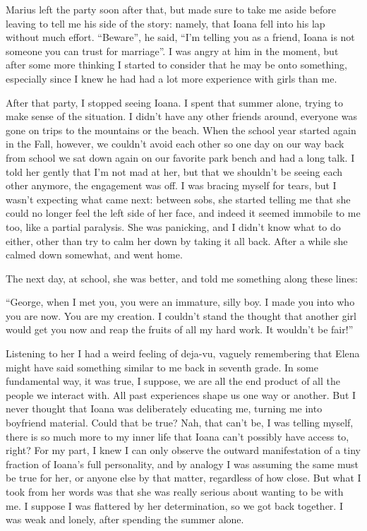 \documentclass[12pt]{book}
\begin{document}
Marius left the party soon after that, but made sure to take me aside
before leaving to tell me his side of the story: namely, that Ioana fell
into his lap without much effort. ``Beware'', he said, ``I'm telling you
as a friend, Ioana is not someone you can trust for marriage''. I was
angry at him in the moment, but after some more thinking I started to
consider that he may be onto something, especially since I knew he had
had a lot more experience with girls than me.

After that party, I stopped seeing Ioana. I spent that summer alone,
trying to make sense of the situation. I didn't have any other friends
around, everyone was gone on trips to the mountains or the beach. When
the school year started again in the Fall, however, we couldn't avoid
each other so one day on our way back from school we sat down again on
our favorite park bench and had a long talk. I told her gently that I'm
not mad at her, but that we shouldn't be seeing each other anymore, the
engagement was off. I was bracing myself for tears, but I wasn't
expecting what came next: between sobs, she started telling me that she
could no longer feel the left side of her face, and indeed it seemed
immobile to me too, like a partial paralysis. She was panicking, and I
didn't know what to do either, other than try to calm her down by taking
it all back. After a while she calmed down somewhat, and went home.

The next day, at school, she was better, and told me something along
these lines:

``George, when I met you, you were an immature, silly boy. I made you
into who you are now. You are my creation. I couldn't stand the thought
that another girl would get you now and reap the fruits of all my hard
work. It wouldn't be fair!''

Listening to her I had a weird feeling of deja-vu, vaguely remembering
that Elena might have said something similar to me back in seventh
grade. In some fundamental way, it was true, I suppose, we are all the
end product of all the people we interact with. All past experiences
shape us one way or another. But I never thought that Ioana was
deliberately educating me, turning me into boyfriend material. Could
that be true? Nah, that can't be, I was telling myself, there is so much
more to my inner life that Ioana can't possibly have access to, right?
For my part, I knew I can only observe the outward manifestation of a
tiny fraction of Ioana's full personality, and by analogy I was assuming
the same must be true for her, or anyone else by that matter, regardless
of how close. But what I took from her words was that she was really
serious about wanting to be with me. I suppose I was flattered by her
determination, so we got back together. I was weak and lonely, after
spending the summer alone.
\end{document}
